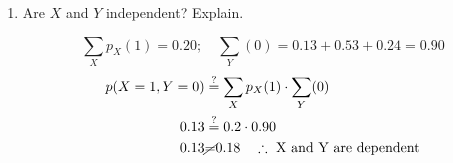 \begin{enumerate}[label=(\alph*)]
        \item Are $X$ and $Y$ independent? Explain.
        \\
        \begin{mdframed}
            \begin{equation*}
                \sum_{X} p_X(1) = 0.20; \quad \sum_{Y}(0) = 0.13 + 0.53 + 0.24 = 0.90
            \end{equation*}
            \begin{align*}
                p(X=1, Y=0) & \stackrel{?}{=} \sum_{X} p_X(1) \cdot \sum_{Y}(0)     \\
                0.13        & \stackrel{?}{=} 0.2 \cdot 0.90                        \\
                0.13        & \cancel{=} 0.18 \quad \therefore \text{ X and Y are dependent}
            \end{align*}
        \end{mdframed}
    \end{enumerate}

    \pagebreak

